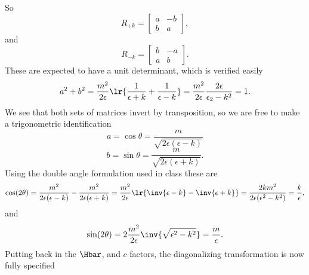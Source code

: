%
So
\begin{dmath}\label{eqn:gradQuantumProblemSet4Problem3:380}
R_{+k}
=
\begin{bmatrix}
a & - b \\
b & a
\end{bmatrix},
\end{dmath}
%
and
\begin{dmath}\label{eqn:gradQuantumProblemSet4Problem3:400}
R_{-k}
=
\begin{bmatrix}
b & -a \\
a & b
\end{bmatrix}.
\end{dmath}
%
These are expected to have a unit determinant, which is verified easily
%
\begin{dmath}\label{eqn:gradQuantumProblemSet4Problem3:420}
a^2 + b^2
=
\frac{m^2}{2 \epsilon}
\lr{
\frac{1}{\epsilon + k}
+
\frac{1}{\epsilon - k}
}
=
\frac{m^2}{2 \epsilon}
\frac{2 \epsilon}{\epsilon_2 - k^2}
= 1.
\end{dmath}
%
We see that both sets of matrices invert by transposition, so we are free to make a trigonometric identification
%
\begin{equation}\label{eqn:gradQuantumProblemSet4Problem3:440}
a = \cos\theta
=
\frac{m}{\sqrt{2\epsilon(\epsilon - k)}}
\end{equation}
%
\begin{equation}\label{eqn:gradQuantumProblemSet4Problem3:460}
b = \sin\theta
=
\frac{m}{\sqrt{2\epsilon(\epsilon + k)}}.
\end{equation}
%
Using the double angle formulation used in class these are
%
\begin{dmath}\label{eqn:gradQuantumProblemSet4Problem3:480}
\cos(2 \theta)
=
\frac{m^2}{2\epsilon(\epsilon - k)} -
\frac{m^2}{2\epsilon(\epsilon + k)}
=
\frac{m^2}{2 \epsilon} \lr{ \inv{\epsilon - k} - \inv{\epsilon + k} }
=
\frac{2 k m^2}{2 \epsilon (\epsilon^2 - k^2)}
=
\frac{k}{\epsilon},
\end{dmath}
%
and
\begin{dmath}\label{eqn:gradQuantumProblemSet4Problem3:500}
\sin(2 \theta)
=
2 \frac{m^2}{2 \epsilon} \inv{\sqrt{\epsilon^2 - k^2}}
=
\frac{m}{\epsilon}.
\end{dmath}
%
Putting back in the \( \Hbar \), and \( c\) factors, the diagonalizing transformation is now fully specified
%
